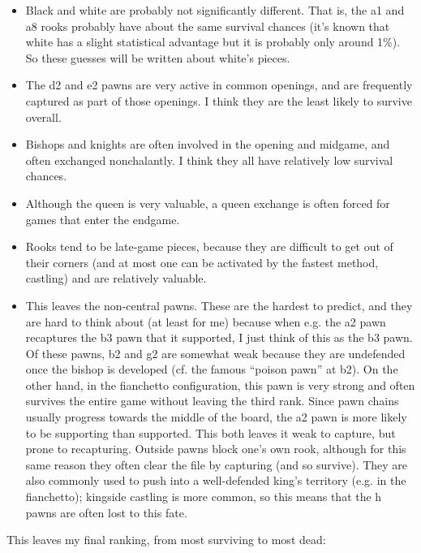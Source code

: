 \documentclass[twocolumn]{article}
\begin{document}
\begin{itemize}
\item Black and white are probably not significantly different. That
  is, the a1 and a8 rooks probably have about the same survival
  chances (it's known that white has a slight statistical advantage
  but it is probably only around 1\%). So these guesses will be
  written about white's pieces.
\item The d2 and e2 pawns are very active in common openings, and
  are frequently captured as part of those openings. I think they
  are the least likely to survive overall.
\item Bishops and knights are often involved in the opening and
  midgame, and often exchanged nonchalantly. I think they all have
  relatively low survival chances.
\item Although the queen is very valuable, a queen exchange is often
  forced for games that enter the endgame.
\item Rooks tend to be late-game pieces, because they are difficult
  to get out of their corners (and at most one can be activated
  by the fastest method, castling) and are relatively valuable.
\item This leaves the non-central pawns. These are the hardest to
  predict, and they are hard to think about (at least for me) because
  when e.g. the a2 pawn recaptures the b3 pawn that it supported, I
  just think of this as the b3 pawn. Of these pawns, b2 and g2 are
  somewhat weak because they are undefended once the bishop is
  developed (cf. the famous ``poison pawn'' at b2). On the other hand,
  in the fianchetto configuration, this pawn is very strong and often
  survives the entire game without leaving the third rank. Since pawn
  chains usually progress towards the middle of the board, the a2 pawn
  is more likely to be supporting than supported. This both leaves it
  weak to capture, but prone to recapturing. Outside pawns block one's
  own rook, although for this same reason they often clear the file by
  capturing (and so survive). They are also commonly used to push into
  a well-defended king's territory (e.g. in the fianchetto); kingside
  castling is more common, so this means that the h pawns are often
  lost to this fate.
\end{itemize}

This leaves my final ranking, from most surviving to most dead:
\end{document}
